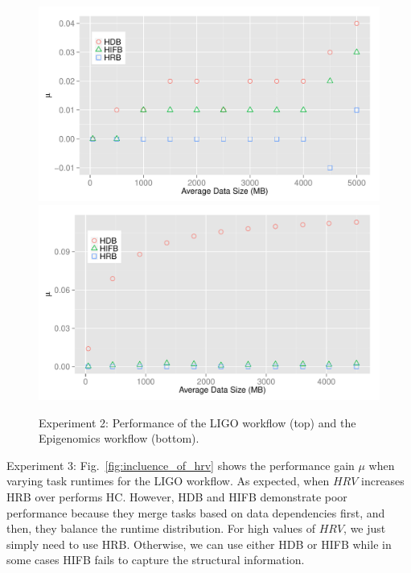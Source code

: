 \documentclass[final]{IEEEtran}
\begin{document}
\begin{figure}[htb]
	\centering
	\includegraphics[width=\linewidth]{figure/exp2_ligo.pdf}
	\includegraphics[width=\linewidth]{figure/exp2_genome.pdf}
	\caption{Experiment 2: Performance of the LIGO workflow (top) and the Epigenomics workflow (bottom).}
	\label{fig:performance}
	\vspace{-10pt}
\end{figure}

Experiment 3: Fig.~\ref{fig:incluence_of_hrv} shows the performance gain $\mu$ when varying task runtimes for the LIGO workflow. As expected, when $HRV$ increases HRB over performs HC. However, HDB and HIFB demonstrate poor performance because they merge tasks based on data dependencies first, and then, they balance the runtime distribution. 
For high values of $HRV$, we just simply need to use HRB. Otherwise, we can use either HDB or HIFB while in some cases HIFB fails to capture the structural information. 
\end{document}
